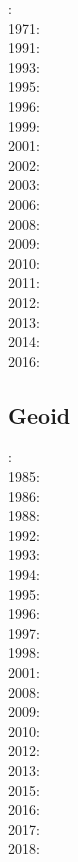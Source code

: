 {\scriptsize
{}: \cite{ramb70}\\
1971: \cite{ramb71}\\
1991: \cite{flet91}\\
1993: \cite{zhhj93}\\
1995: \cite{flet95}\\
1996: \cite{zhho96}\\
1999: \cite{nagg99}\\
2001: \cite{scpo01}\\
2002: \cite{mumh02}\\
2003: \cite{nagv03}\\
2006: \cite{frsc06}\\
2008: \cite{schm08}\cite{manc08}\cite{scdk08}\\
2009: \cite{simp09}\\
2010: \cite{resb10}\\
2011: \cite{freh11}\\
2012: \cite{reds12}\cite{grsc12}\cite{scsc12}\\
2013: \cite{regc13}\\
2014: \cite{freh14}\cite{frex14}\\
2016: \cite{frsc16}
}

\subsection{Geoid}

{\scriptsize
{}: \cite{davi84}\cite{hage84}\cite{riff84}\cite{riha84}\\
1985: \cite{hacr85}\\
1986: \cite{davi86}\\
1988: \cite{besz88}\cite{fope88}\\
1992: \cite{zhgu92}\cite{kiha92}\\
1993: \cite{zhch93}\cite{rirl93}\\
1994: \cite{kiha94}\\
1995: \cite{king95}\cite{mopa95}\\
1996: \cite{mogu96}\\
1997: \cite{wean97a}\\
1998: \cite{cava98}\cite{chki98}\\
2001: \cite{zhon01}\\
2008: \cite{meco08}\\
2009: \cite{king09}\\
2010: \cite{ghbz10}\cite{spgs10b}\\
2012: \cite{hibi12}\\
2013: \cite{shsc13}\cite{chus13}\\
2015: \cite{lizh15}\\
2016: \cite{necg16}\\
2017: \cite{grab17}\\
2018: \cite{king18}
}

